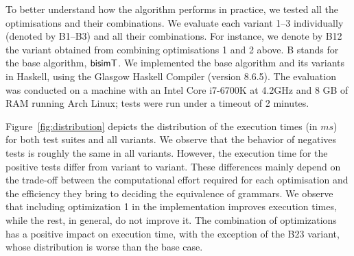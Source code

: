 To better understand how the algorithm performs in practice, we tested
all the optimisations and their combinations. We evaluate each variant 
1--3 individually (denoted
by B1--B3) and all their combinations. For instance, we denote by B12
the variant obtained from combining optimisations 1 and 2 above.
B stands for the base algorithm, $\mathsf{bisimT}$.
%
We implemented the base algorithm and its
variants %
in Haskell, using the Glasgow Haskell Compiler (version
8.6.5).
The evaluation was conducted on a machine with an Intel Core i7-6700K
at 4.2GHz and 8 GB of RAM running Arch Linux; tests were run under a
timeout of 2 minutes.

%

Figure~\ref{fig:distribution} depicts the distribution of the execution
times (in $ms$) for both test suites and all variants. We observe that 
the behavior of negatives tests is roughly the same in all variants. However,
the execution time for the positive tests differ from variant to variant. These
differences mainly depend on the trade-off between the computational
effort required for each optimisation and the efficiency they bring to
deciding the equivalence of grammars.
We observe that including optimization 1 in the implementation improves 
execution times, while the rest, in general, do not improve it. The 
combination of optimizations has a positive impact on execution time, 
with the exception of the B23 variant, whose distribution is worse than 
the base case.

